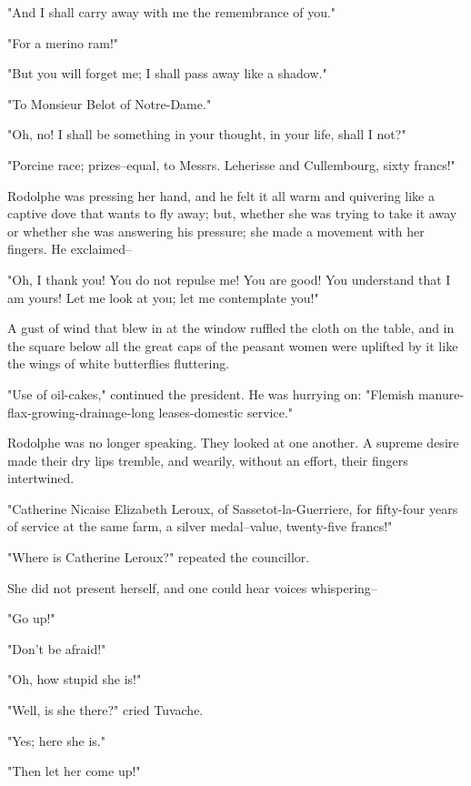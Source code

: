 \documentclass{tufte-book}
\begin{document}
"And I shall carry away with me the remembrance of you."

"For a merino ram!"

"But you will forget me; I shall pass away like a shadow."

"To Monsieur Belot of Notre-Dame."

"Oh, no! I shall be something in your thought, in your life, shall I
not?"

"Porcine race; prizes--equal, to Messrs. Leherisse and Cullembourg,
sixty francs!"

Rodolphe was pressing her hand, and he felt it all warm and quivering
like a captive dove that wants to fly away; but, whether she was trying
to take it away or whether she was answering his pressure; she made a
movement with her fingers. He exclaimed--

"Oh, I thank you! You do not repulse me! You are good! You understand
that I am yours! Let me look at you; let me contemplate you!"

A gust of wind that blew in at the window ruffled the cloth on the
table, and in the square below all the great caps of the peasant women
were uplifted by it like the wings of white butterflies fluttering.

"Use of oil-cakes," continued the president. He was hurrying on:
"Flemish manure-flax-growing-drainage-long leases-domestic service."

Rodolphe was no longer speaking. They looked at one another. A supreme
desire made their dry lips tremble, and wearily, without an effort,
their fingers intertwined.

"Catherine Nicaise Elizabeth Leroux, of Sassetot-la-Guerriere, for
fifty-four years of service at the same farm, a silver medal--value,
twenty-five francs!"

"Where is Catherine Leroux?" repeated the councillor.

She did not present herself, and one could hear voices whispering--

"Go up!"

"Don't be afraid!"

"Oh, how stupid she is!"

"Well, is she there?" cried Tuvache.

"Yes; here she is."

"Then let her come up!"
\end{document}
